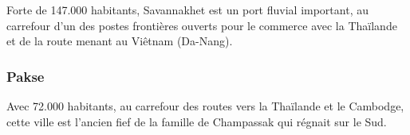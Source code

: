 \begin{multicols}{2}
Forte de 147.000 habitants, Savannakhet est un port fluvial important, au carrefour d’un des postes frontières ouverts pour le commerce avec la Thaïlande et de la route menant au Viêtnam (Da-Nang).

\subsubsection{Pakse}

Avec 72.000 habitants, au carrefour des routes vers la Thaïlande et le Cambodge, cette ville est l’ancien fief de la famille de Champassak qui régnait sur le Sud.

\end{multicols}
